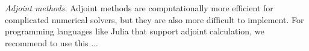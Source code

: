 
\vspace{5px}
\noindent\textit{Adjoint methods. }
Adjoint methods are computationally more efficient for complicated numerical solvers, but they are also more difficult to implement.
For programming languages like Julia that support adjoint calculation, we recommend to use this ... 








